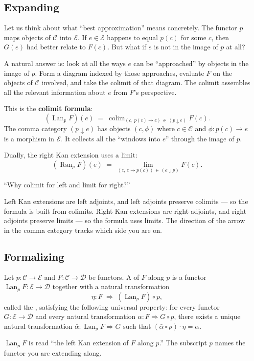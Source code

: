 \subsection{Expanding}

Let us think about what ``best approximation'' means concretely. The functor $p$
maps objects of $\mathcal{C}$ into $\mathcal{E}$. If $e \in \mathcal{E}$ happens
to equal $p(c)$ for some $c$, then $G(e)$ had better relate to $F(c)$. But what
if $e$ is not in the image of $p$ at all?

A natural answer is: look at all the ways $e$ can be ``approached'' by objects
in the image of $p$. Form a diagram indexed by those approaches, evaluate $F$ on
the objects of $\mathcal{C}$ involved, and take the colimit of that diagram.
The colimit assembles all the relevant information about $e$ from $F$'s perspective.

This is the \textbf{colimit formula}:
\[
  (\operatorname{Lan}_p F)(e) \;=\; \operatorname{colim}_{(c,\, p(c) \to e)\,\in\, (p \downarrow e)} F(c).
\]
The comma category $(p \downarrow e)$ has objects $(c, \phi)$ where
$c \in \mathcal{C}$ and $\phi : p(c) \to e$ is a morphism in $\mathcal{E}$.
It collects all the ``windows into $e$'' through the image of $p$.

Dually, the right Kan extension uses a limit:
\[
  (\operatorname{Ran}_p F)(e) \;=\; \lim_{(c,\, e \to p(c))\,\in\, (e \downarrow p)} F(c).
\]

\begin{dialog}
``Why colimit for left and limit for right?''

Left Kan extensions are left adjoints, and left adjoints preserve colimits — so
the formula is built from colimits. Right Kan extensions are right adjoints, and
right adjoints preserve limits — so the formula uses limits. The direction of the
arrow in the comma category tracks which side you are on.
\end{dialog}

\subsection{Formalizing}

\begin{definition}
Let $p : \mathcal{C} \to \mathcal{E}$ and $F : \mathcal{C} \to \mathcal{D}$ be
functors. A  of $F$ along $p$ is a functor
$\operatorname{Lan}_p F : \mathcal{E} \to \mathcal{D}$ together with a natural
transformation
\[
  \eta : F \;\Rightarrow\; (\operatorname{Lan}_p F) \circ p,
\]
called the , satisfying the following universal property: for every
functor $G : \mathcal{E} \to \mathcal{D}$ and every natural transformation
$\alpha : F \Rightarrow G \circ p$, there exists a unique natural transformation
$\bar{\alpha} : \operatorname{Lan}_p F \Rightarrow G$ such that
$(\bar{\alpha} \circ p) \cdot \eta = \alpha$.

\begin{howtosay}
$\operatorname{Lan}_p F$ is read ``the left Kan extension of $F$ along $p$.''
The subscript $p$ names the functor you are extending along.
\end{howtosay}
\end{definition}

